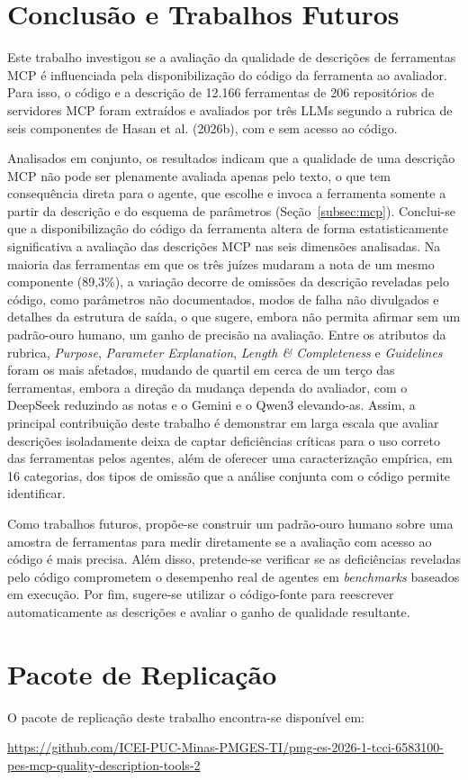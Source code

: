 \section{Conclusão e Trabalhos Futuros}
\label{sec:conclusao}

 
Este trabalho investigou se a avaliação da qualidade de descrições de ferramentas MCP é influenciada pela disponibilização do código da ferramenta ao avaliador. Para isso, o código e a descrição de 12.166 ferramentas de 206 repositórios de servidores MCP foram extraídos e avaliados por três LLMs segundo a rubrica de seis componentes de Hasan et al. (2026b)\nocite{2026arXiv260214878M}, com e sem acesso ao código.

Analisados em conjunto, os resultados indicam que a qualidade de uma descrição MCP não pode ser plenamente avaliada apenas pelo texto, o que tem consequência direta para o agente, que escolhe e invoca a ferramenta somente a partir da descrição e do esquema de parâmetros (Seção~\ref{subsec:mcp}). Conclui-se que a disponibilização do código da ferramenta altera de forma estatisticamente significativa a avaliação das descrições MCP nas seis dimensões analisadas. Na maioria das ferramentas em que os três juízes mudaram a nota de um mesmo componente (89,3\%), a variação decorre de omissões da descrição reveladas pelo código, como parâmetros não documentados, modos de falha não divulgados e detalhes da estrutura de saída, o que sugere, embora não permita afirmar sem um padrão-ouro humano, um ganho de precisão na avaliação. Entre os atributos da rubrica, \textit{Purpose}, \textit{Parameter Explanation}, \textit{Length \& Completeness} e \textit{Guidelines} foram os mais afetados, mudando de quartil em cerca de um terço das ferramentas, embora a direção da mudança dependa do avaliador, com o DeepSeek reduzindo as notas e o Gemini e o Qwen3 elevando-as. Assim, a principal contribuição deste trabalho é demonstrar em larga escala que avaliar descrições isoladamente deixa de captar deficiências críticas para o uso correto das ferramentas pelos agentes, além de oferecer uma caracterização empírica, em 16 categorias, dos tipos de omissão que a análise conjunta com o código permite identificar.

Como trabalhos futuros, propõe-se construir um padrão-ouro humano sobre uma amostra de ferramentas para medir diretamente se a avaliação com acesso ao código é mais precisa. Além disso, pretende-se verificar se as deficiências reveladas pelo código comprometem o desempenho real de agentes em \textit{benchmarks} baseados em execução. Por fim, sugere-se utilizar o código-fonte para reescrever automaticamente as descrições e avaliar o ganho de qualidade resultante.

\section*{Pacote de Replicação}

O pacote de replicação deste trabalho encontra-se disponível em:

\url{https://github.com/ICEI-PUC-Minas-PMGES-TI/pmg-es-2026-1-tcci-6583100-pes-mcp-quality-description-tools-2}
